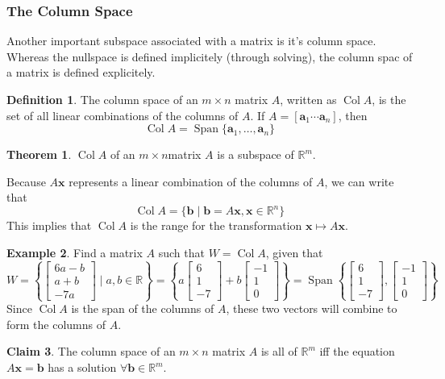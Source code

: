 \documentclass{article}
\numberwithin{equation}{section}
\theoremstyle{definition}
\newtheorem{thm}{Theorem}[subsection]
\newtheorem{defn}{Definition}[subsection]
\newtheorem{ex}[thm]{Example}
\newtheorem{claim}[thm]{Claim}
\newcommand{\R}{\mathbb{R}}
\DeclareMathOperator{\spa}{Span}
\DeclareMathOperator{\col}{Col}
\let\oldforall\forall
\renewcommand{\forall}{\mathrel{\oldforall}}
\newcommand{\x}{\times}
\theoremstyle{adefn}
\begin{document}
	\subsubsection{The Column Space}
	Another important subspace associated with a matrix is it's column space. Whereas the nullspace is defined implicitely (through solving), the column spac of a matrix is defined explicitely. 
	\begin{defn}
		The column space of an $m \x n$ matrix $A$, written as $\col A$, is the set of all linear combinations of the columns of $A$. If $A = [\textbf{a}_1 \cdots \textbf{a}_n]$, then 
		$$\col A = \spa \{\textbf{a}_1, \ldots, \textbf{a}_n\}$$
	\end{defn}
	\begin{thm}
		$\col A$ of an $m \x n$matrix $A$ is a subspace of $\R^m$.
	\end{thm}
	Because $A\textbf{x}$ represents a linear combination of the columns of $A$, we can write that 
	$$\col A = \{\textbf{b} \mid \textbf{b} = A\textbf{x}, \textbf{x} \in \R^n\}$$
	This implies that $\col A$ is the range for the transformation $\textbf{x} \mapsto A\textbf{x}$.
	\begin{ex}
		Find a matrix $A$ such that $W = \col A$, given that
		$$W = \left\{ \begin{bmatrix}
			6a-b\\a+b\\-7a
		\end{bmatrix} \mid a, b \in \R \right\} = \left\{ a\begin{bmatrix}
			6 \\ 1 \\ -7
		\end{bmatrix} + b\begin{bmatrix}
			-1 \\ 1 \\ 0
		\end{bmatrix} \right\} = \spa \left\{ \begin{bmatrix}
			6 \\ 1 \\ -7
		\end{bmatrix}, \begin{bmatrix}
			-1 \\ 1 \\ 0
		\end{bmatrix} \right\}$$
		Since $\col A$ is the span of the columns of $A$, these two vectors will combine to form the columns of $A$. 
	\end{ex}
	\begin{claim}
		The column space of an $m \x n$ matrix $A$ is all of $\R^m$ iff the equation $A\textbf{x} = \textbf{b}$ has a solution $\forall \textbf{b} \in \R^m$.
	\end{claim}
\end{document}
